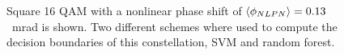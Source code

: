 \begin{figure}[H]
  \centering
  \qquad
  \caption{Square 16 QAM with a nonlinear phase shift of $\braket{\phi_{NLPN}}= 0.13$~mrad is shown. Two different schemes where used to compute the decision boundaries of this constellation, SVM and random forest.}                                                                                                                                                                                                                                                                                                                                                                                                                                                                                                                                                                                                                                                                                                                                                                                                                                                                                                                                                                                                                                                                                                                                                                                                                                                                                                                                                                                                                                                                                                                                                                                                                                                                                                                                                                                                                                                                                                                                                                                                                                                                                                                                                                                                                                                                                                                                                                                                                                                                                                                                                                                                                                                                                                                                                                                                                                                                                                                                   
\end{figure}
